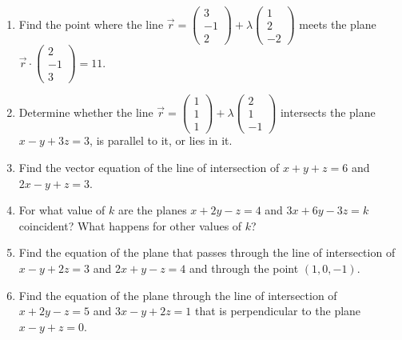\documentclass[11pt]{article}
\begin{document}
\begin{exercice}[Practice]
\begin{enumerate}
\item Find the point where the line $\vec{r} = \begin{pmatrix} 3 \\ -1 \\ 2 \end{pmatrix} + \lambda\begin{pmatrix} 1 \\ 2 \\ -2 \end{pmatrix}$ meets the plane $\vec{r}\cdot\begin{pmatrix} 2 \\ -1 \\ 3 \end{pmatrix} = 11$.
\item Determine whether the line $\vec{r} = \begin{pmatrix} 1 \\ 1 \\ 1 \end{pmatrix} + \lambda\begin{pmatrix} 2 \\ 1 \\ -1 \end{pmatrix}$ intersects the plane $x - y + 3z = 3$, is parallel to it, or lies in it.
\item Find the vector equation of the line of intersection of $x + y + z = 6$ and $2x - y + z = 3$.
\item For what value of $k$ are the planes $x + 2y - z = 4$ and $3x + 6y - 3z = k$ coincident? What happens for other values of $k$?
\item Find the equation of the plane that passes through the line of intersection of $x - y + 2z = 3$ and $2x + y - z = 4$ and through the point $(1,0,-1)$.
\item Find the equation of the plane through the line of intersection of $x + 2y - z = 5$ and $3x - y + 2z = 1$ that is perpendicular to the plane $x - y + z = 0$.
\end{enumerate}
\end{exercice}
\end{document}

